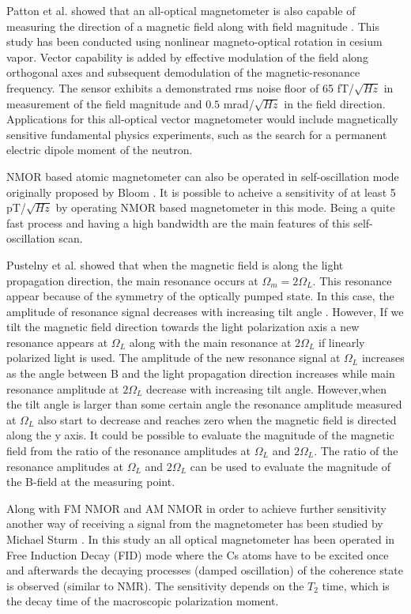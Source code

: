 Patton et al. \cite{bib:vectormagnetometer} showed that an all-optical magnetometer is also capable of measuring the direction of a magnetic field along with field magnitude .  This study has been conducted using nonlinear magneto-optical rotation in cesium vapor.  Vector capability is added by effective modulation of the field along orthogonal axes and subsequent demodulation of the magnetic-resonance frequency.  The sensor exhibits a demonstrated rms noise floor of   65 fT/$\sqrt {Hz}$ in measurement of the field magnitude and $ 0.5$  mrad/$\sqrt {Hz}$ in the field direction.  Applications for this all-optical vector magnetometer would include magnetically sensitive fundamental physics experiments, such as the search for a permanent electric dipole moment of the neutron.

NMOR based atomic magnetometer can also be operated in self-oscillation mode \cite{PhysRevA.62.043403}\cite{bib:Budker_2006} originally proposed by Bloom \cite{bib:Bloom_62}. It is possible to acheive a sensitivity of at least 5 pT/$\sqrt {Hz}$ by operating NMOR based magnetometer in this mode.
 Being a quite fast process and having a high bandwidth are
the main features of this self-oscillation scan. 

Pustelny et al. \cite{PhysRevA.74.063420}  showed that when the magnetic field is along the light propagation direction, the main resonance occurs at $\Omega_m = 2\Omega_L$. This resonance appear because of the symmetry of the optically pumped state.  In this case, the amplitude of resonance signal decreases with increasing tilt angle . However, If we tilt the magnetic field direction towards the light polarization axis a new resonance appears at $\Omega_L$ along with the main resonance at $2\Omega_L$ if linearly polarized light is used. The amplitude of the new resonance signal at $\Omega_L$  increases as the angle between B and the light propagation direction increases while main resonance amplitude at $2\Omega_L$  decrease with increasing tilt angle. However,when the tilt angle is larger than some certain angle the resonance amplitude measured at $\Omega_L$ also start to decrease and reaches zero when the magnetic field is directed along the y axis.   It could be possible to evaluate the magnitude of the magnetic field from the ratio of the resonance amplitudes at $\Omega_L$ and $2\Omega_L$. The ratio of the resonance amplitudes at $\Omega_L$ and $2\Omega_L$ can be used to
evaluate the magnitude of the B-field at the measuring point.


Along with FM NMOR and AM NMOR in order to achieve further sensitivity another way of receiving a signal from the magnetometer
has been studied by Michael Sturm \cite{mythesis}. In this study an all optical magnetometer has been operated in Free Induction Decay (FID) mode where the Cs atoms have to be excited
once and afterwards the decaying processes (damped oscillation) of the coherence state is
observed (similar to NMR). The sensitivity depends on the $T_2$ time, which is the decay time
of the macroscopic polarization moment.


